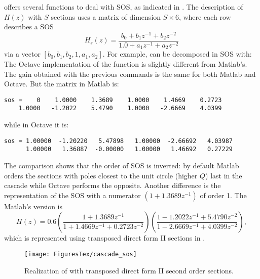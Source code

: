 {\matlab} offers several functions to deal with SOS, as indicated in . The description of $H(z)$ with $S$ sections uses a matrix of dimension $S \times 6$, where each row describes a SOS
\[
H_s(z) = \frac{b_0  + b_1  z^{-1} + b_2 z^{-2}}{1.0  + a_1 z^{-1}  + a_2 z^{-2}}
\]
via a vector $[b_0, b_1, b_2, 1, a_1, a_2]$. For example,  can be decomposed in SOS with:
The Octave implementation of the  function is slightly different from Matlab's. The gain  obtained with the previous commands is the same for both Matlab and Octave. But the  matrix in Matlab is:
\begin{verbatim}
sos =    0    1.0000    1.3689    1.0000    1.4669    0.2723
    1.0000   -1.2022    5.4790    1.0000   -2.6669    4.0399
\end{verbatim}
while in Octave it is:
\begin{verbatim}
sos = 1.00000  -1.20220   5.47898   1.00000  -2.66692   4.03987
      1.00000   1.36887  -0.00000   1.00000   1.46692   0.27229
\end{verbatim}
The comparison shows that the order of SOS is inverted: by default Matlab orders the sections with poles closest to the unit circle (higher $Q$) last in the cascade while Octave performs the opposite. Another difference is the representation of the SOS with a numerator $(1 + 1.3689z^{-1})$ of order 1. The Matlab's version is
\[
H(z) = 0.6 \left(\frac{1 + 1.3689z^{-1}}{1 + 1.4669z^{-1} + 0.2723z^{-2}}\right) \left(\frac{1 -1.2022z^{-1} + 5.4790 z^{-2}}{1 - 2.6669z^{-1} + 4.0399z^{-2}}\right),
\]
which is represented using transposed direct form II sections in .

\begin{figure}
\centering
\texttt{[image: FiguresTex/cascade\_sos]} 
\caption{Realization of  with transposed direct form II second order sections.\label{fig:cascade_sos}}
\end{figure}

